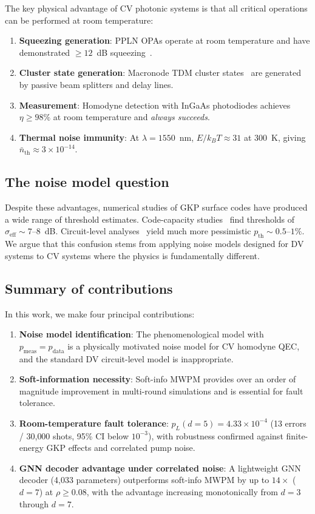\documentclass[twocolumn,showpacs,preprintnumbers,amsmath,amssymb,superscriptaddress]{revtex4-2}
\begin{document}
The key physical advantage of CV photonic systems is that all critical operations can be performed at room temperature:
\begin{enumerate}
\item \textbf{Squeezing generation}: PPLN OPAs operate at room temperature and have demonstrated $\geq 12$~dB squeezing~\cite{takase2024,vahlbruch2016}.
\item \textbf{Cluster state generation}: Macronode TDM cluster states~\cite{menicucci2014,walshe2019} are generated by passive beam splitters and delay lines.
\item \textbf{Measurement}: Homodyne detection with InGaAs photodiodes achieves $\eta \geq 98\%$ at room temperature and \emph{always succeeds}.
\item \textbf{Thermal noise immunity}: At $\lambda = 1550$~nm, $E/k_BT \approx 31$ at 300~K, giving $\bar{n}_{\mathrm{th}} \approx 3 \times 10^{-14}$.
\end{enumerate}

\subsection{The noise model question}

Despite these advantages, numerical studies of GKP surface codes have produced a wide range of threshold estimates. Code-capacity studies~\cite{noh2020,grimsmo2020} find thresholds of $\sigma_{\mathrm{eff}} \sim 7$--$8$~dB. Circuit-level analyses~\cite{bourassa2021} yield much more pessimistic $p_{\mathrm{th}} \sim 0.5$--$1\%$. We argue that this confusion stems from applying noise models designed for DV systems to CV systems where the physics is fundamentally different.

\subsection{Summary of contributions}

In this work, we make four principal contributions:
\begin{enumerate}
\item \textbf{Noise model identification}: The phenomenological model with $p_{\mathrm{meas}} = p_{\mathrm{data}}$ is a physically motivated noise model for CV homodyne QEC, and the standard DV circuit-level model is inappropriate.
\item \textbf{Soft-information necessity}: Soft-info MWPM provides over an order of magnitude improvement in multi-round simulations and is essential for fault tolerance.
\item \textbf{Room-temperature fault tolerance}: $p_L(d{=}5) = 4.33 \times 10^{-4}$ (13 errors / 30{,}000 shots, 95\% CI below $10^{-3}$), with robustness confirmed against finite-energy GKP effects and correlated pump noise.
\item \textbf{GNN decoder advantage under correlated noise}: A lightweight GNN decoder (4{,}033 parameters) outperforms soft-info MWPM by up to $14\times$ ($d = 7$) at $\rho \geq 0.08$, with the advantage increasing monotonically from $d = 3$ through $d = 7$.
\end{enumerate}
\end{document}
